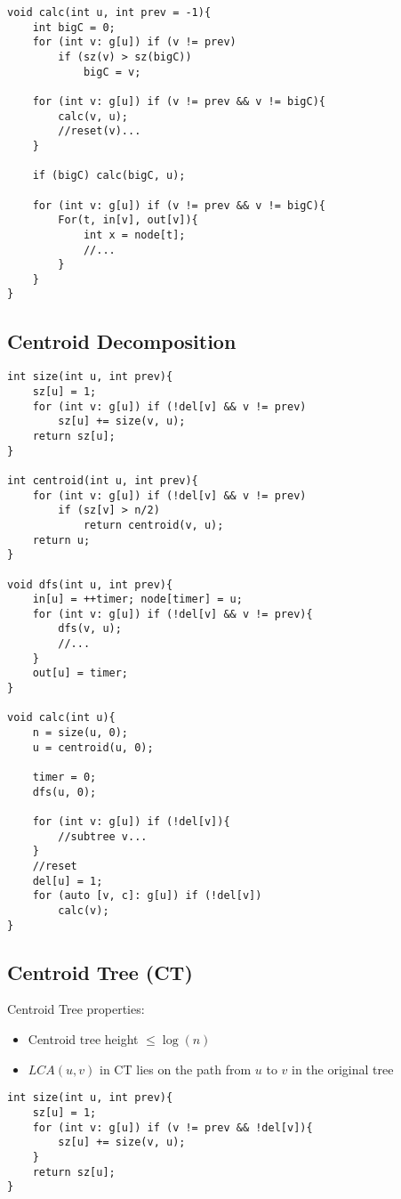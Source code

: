 \documentclass[11pt,a4paper]{article}
\begin{document}
\begin{multicols*}{2}
\begin{lstlisting}
void calc(int u, int prev = -1){
	int bigC = 0;
	for (int v: g[u]) if (v != prev)
		if (sz(v) > sz(bigC))
			bigC = v;
	
	for (int v: g[u]) if (v != prev && v != bigC){
        calc(v, u);
        //reset(v)...
    }
		
	if (bigC) calc(bigC, u);
	
	for (int v: g[u]) if (v != prev && v != bigC){
		For(t, in[v], out[v]){
			int x = node[t];
			//...
		}
	}
}
\end{lstlisting}

\subsection{Centroid Decomposition}
\begin{lstlisting}
int size(int u, int prev){
	sz[u] = 1;
	for (int v: g[u]) if (!del[v] && v != prev)
		sz[u] += size(v, u);
	return sz[u];
}

int centroid(int u, int prev){
	for (int v: g[u]) if (!del[v] && v != prev)
		if (sz[v] > n/2)
			return centroid(v, u);
	return u;
}

void dfs(int u, int prev){
    in[u] = ++timer; node[timer] = u;
    for (int v: g[u]) if (!del[v] && v != prev){
        dfs(v, u);
        //...
    }
    out[u] = timer;
}

void calc(int u){
	n = size(u, 0);
	u = centroid(u, 0);
	
	timer = 0;
	dfs(u, 0);
	
    for (int v: g[u]) if (!del[v]){
        //subtree v...
    }
    //reset
	del[u] = 1;
	for (auto [v, c]: g[u]) if (!del[v])
		calc(v);
}
\end{lstlisting}

\subsection{Centroid Tree (CT)}
Centroid Tree properties:
\begin{itemize}
    \item Centroid tree height $ \leq \log(n) $
    \item $LCA(u, v)$ in CT lies on the path from $u$ to $v$ in the original tree
\end{itemize}


\begin{lstlisting}
int size(int u, int prev){
	sz[u] = 1;
	for (int v: g[u]) if (v != prev && !del[v]){
		sz[u] += size(v, u);
	}
    return sz[u];
}
 

\end{lstlisting}
\end{multicols*}
\end{document}
